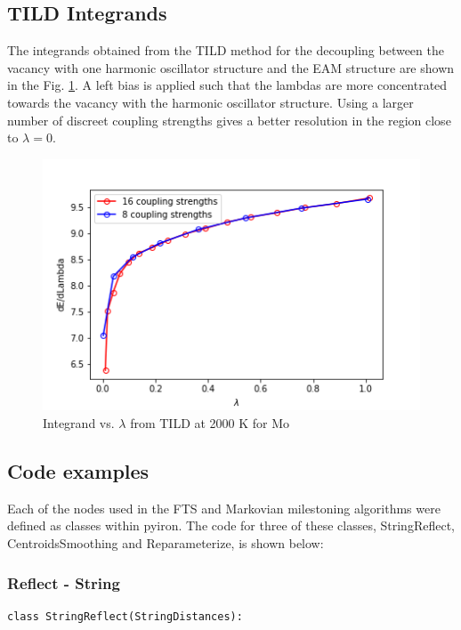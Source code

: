\documentclass{article}
\begin{document}
{\subsection{TILD Integrands}

The integrands obtained from the TILD method for the decoupling between the vacancy with one harmonic oscillator structure and the EAM structure are shown in the Fig. \ref{fig:25}. A left bias is applied such that the lambdas are more concentrated towards the vacancy with the harmonic oscillator structure. Using a larger number of discreet coupling strengths gives a better resolution in the region close to $\lambda = 0$.

\begin{figure}[!htp]
\centering
\includegraphics[scale=0.65]{lambdas}
\caption{Integrand vs. $\lambda$ from TILD at 2000 K for Mo}
\label{fig:25}
\end{figure}

\subsection{Code examples}

Each of the nodes used in the FTS and Markovian milestoning algorithms were defined as classes within pyiron. The code for three of these classes, StringReflect, CentroidsSmoothing and Reparameterize, is shown below:

\subsubsection{Reflect - String}

\begin{lstlisting}
class StringReflect(StringDistances):


\end{lstlisting}}
\end{document}
